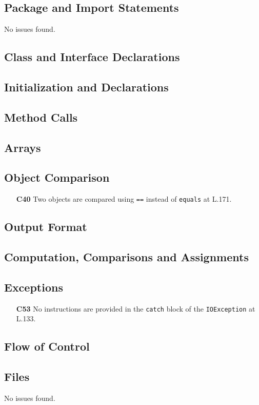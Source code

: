 \subsection{Package and Import Statements}
No issues found.

\subsection{Class and Interface Declarations}
\blindtext

\subsection{Initialization and Declarations}
\blindtext

\subsection{Method Calls}
\blindtext

\subsection{Arrays}
\blindtext

\subsection{Object Comparison}
	\begin{itemize}
		\item[\textbf{C40}] Two objects are compared using \texttt{==} instead of \texttt{equals} at L.171.
	\end{itemize}

\subsection{Output Format}
\blindtext

\subsection{Computation, Comparisons and Assignments}
\blindtext

\subsection{Exceptions}
	\begin{itemize}
		\item[\textbf{C53}] No instructions are provided in the \texttt{catch} block of the \texttt{IOException} at L.133.
	\end{itemize}

\subsection{Flow of Control}
\blindtext

\subsection{Files}
No issues found.
